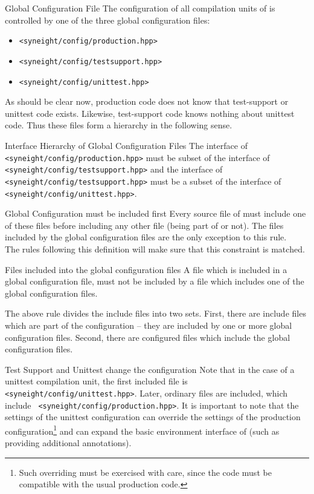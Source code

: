 \begin{definition*}{Global Configuration File}
  \label{def:global-config-file}
  The configuration of all compilation units of \SYNEIGHT is controlled by
  one of the three global configuration files:
  \begin{itemize}
  \item {\tt <syneight/config/production.hpp>}
  \item {\tt <syneight/config/testsupport.hpp>}
  \item {\tt <syneight/config/unittest.hpp>}
  \end{itemize}
\end{definition*}
%
As should be clear now, production code does not know that
test-support or unittest code exists. Likewise, test-support code
knows nothing about unittest code. Thus these files form a hierarchy
in the following sense.
%
\begin{rule*}{Interface Hierarchy of Global Configuration Files}
  \label{rule:global-config-file-hier}
  The interface of {\tt <syneight/config/production.hpp>} must be
  subset of the interface of {\tt <syneight/config/testsupport.hpp>}
  and the interface of {\tt <syneight/config/testsupport.hpp>} must be a
  subset of the interface of {\tt <syneight/config/unittest.hpp>}.
\end{rule*}
%
\begin{rule*}{Global Configuration must be included first}
  \label{rule:global-config-first}
  Every source file of \SYNEIGHT must include one of these files before
  including any other file (being part of \SYNEIGHT or not).
  The files included by the global configuration files are the only
  exception to this rule.\\
  The rules following this definition will make sure that this
  constraint is matched.
\end{rule*}
%
\begin{rule*}{Files included into the global configuration files}
  A file which is included in a global configuration file, must not
  be included by a file which includes one of the global configuration
  files. 
\end{rule*}
%
The above rule divides the include files into two sets. First, there
are include files which are part of the configuration --  they are
included by one or more global configuration files. Second, there are
configured files which include the global configuration files.
%
%
\begin{remark*}{Test Support and Unittest change the configuration}
  Note that in the case of a unittest compilation unit, the first
  included file is {\tt <syneight/config/unittest.hpp>}. Later,
  ordinary \SYNEIGHT files are included, which include {\tt
    <syneight/config/production.hpp>}. 
  It is important to note that the settings of the unittest
  configuration can override the settings of the production
  configuration\footnote{Such overriding must be exercised with care,
    since the code must be compatible with the usual production code.}
  and can expand the basic environment interface of \SYNEIGHT (such as
  providing additional annotations).
\end{remark*}


